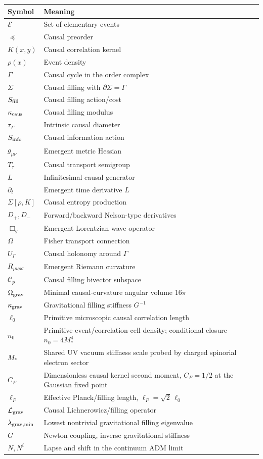 \documentclass[11pt]{article}
\newcommand{\E}{\mathcal E}
\newcommand{\C}{\mathcal C}
\newcommand{\pre}{\preceq}
\begin{document}
\begin{center}
\begin{tabular}{ll}
\toprule
Symbol & Meaning\\
\midrule
$\E$ & Set of elementary events\\
$\pre$ & Causal preorder\\
$K(x,y)$ & Causal correlation kernel\\
$\rho(x)$ & Event density\\
$\Gamma$ & Causal cycle in the order complex\\
$\Sigma$ & Causal filling with $\partial\Sigma=\Gamma$\\
$S_{\rm fill}$ & Causal filling action/cost\\
$\kappa_{\rm caus}$ & Causal filling modulus\\
$\tau_\Gamma$ & Intrinsic causal diameter\\
$S_{\rm info}$ & Causal information action\\
$g_{\mu\nu}$ & Emergent metric Hessian\\
$T_\tau$ & Causal transport semigroup\\
$L$ & Infinitesimal causal generator\\
$\partial_t$ & Emergent time derivative $L$\\
$\Sigma[\rho,K]$ & Causal entropy production\\
$D_+,D_-$ & Forward/backward Nelson-type derivatives\\
$\Box_g$ & Emergent Lorentzian wave operator\\
$\Omega$ & Fisher transport connection\\
$U_\Gamma$ & Causal holonomy around $\Gamma$\\
$R_{\mu\nu\rho\sigma}$ & Emergent Riemann curvature\\
$\C_p$ & Causal filling bivector subspace\\
$\Omega_{\rm grav}$ & Minimal causal-curvature angular volume $16\pi$\\
$\kappa_{\rm grav}$ & Gravitational filling stiffness $G^{-1}$\\
$\ell_0$ & Primitive microscopic causal correlation length\\
$n_0$ & Primitive event/correlation-cell density; conditional closure $n_0=4M_*^4$\\
$M_*$ & Shared UV vacuum stiffness scale probed by charged spinorial electron sector\\
$C_F$ & Dimensionless causal kernel second moment, $C_F=1/2$ at the Gaussian fixed point\\
$\ell_P$ & Effective Planck/filling length, $\ell_P=\sqrt2\,\ell_0$\\
$\mathcal L_{\rm grav}$ & Causal Lichnerowicz/filling operator\\
$\lambda_{\rm grav,min}$ & Lowest nontrivial gravitational filling eigenvalue\\
$G$ & Newton coupling, inverse gravitational stiffness\\
$N,N^i$ & Lapse and shift in the continuum ADM limit\\
\bottomrule
\end{tabular}
\end{center}
\end{document}
